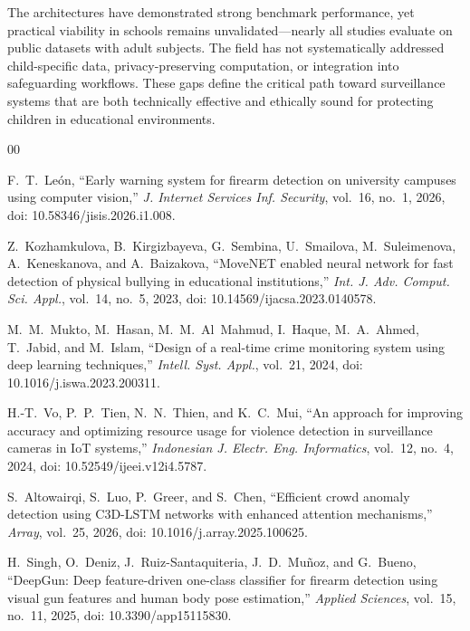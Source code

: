 \documentclass[conference]{IEEEtran}
\begin{document}
The architectures have demonstrated strong benchmark performance, yet practical viability in schools remains unvalidated---nearly all studies evaluate on public datasets with adult subjects. The field has not systematically addressed child-specific data, privacy-preserving computation, or integration into safeguarding workflows. These gaps define the critical path toward surveillance systems that are both technically effective and ethically sound for protecting children in educational environments.

\begin{thebibliography}{00}
\renewcommand{\bibfont}{\scriptsize}
\setlength{\bibsep}{0pt}
\setlength{\bibitemsep}{0pt}

 F.~T.~Le\'{o}n, ``Early warning system for firearm detection on university campuses using computer vision,'' \textit{J. Internet Services Inf. Security}, vol.~16, no.~1, 2026, doi: 10.58346/jisis.2026.i1.008.

 Z.~Kozhamkulova, B.~Kirgizbayeva, G.~Sembina, U.~Smailova, M.~Suleimenova, A.~Keneskanova, and A.~Baizakova, ``MoveNET enabled neural network for fast detection of physical bullying in educational institutions,'' \textit{Int. J. Adv. Comput. Sci. Appl.}, vol.~14, no.~5, 2023, doi: 10.14569/ijacsa.2023.0140578.

 M.~M.~Mukto, M.~Hasan, M.~M.~Al~Mahmud, I.~Haque, M.~A.~Ahmed, T.~Jabid, and M.~Islam, ``Design of a real-time crime monitoring system using deep learning techniques,'' \textit{Intell. Syst. Appl.}, vol.~21, 2024, doi: 10.1016/j.iswa.2023.200311.

 H.-T.~Vo, P.~P.~Tien, N.~N.~Thien, and K.~C.~Mui, ``An approach for improving accuracy and optimizing resource usage for violence detection in surveillance cameras in IoT systems,'' \textit{Indonesian J. Electr. Eng. Informatics}, vol.~12, no.~4, 2024, doi: 10.52549/ijeei.v12i4.5787.

 S.~Altowairqi, S.~Luo, P.~Greer, and S.~Chen, ``Efficient crowd anomaly detection using C3D-LSTM networks with enhanced attention mechanisms,'' \textit{Array}, vol.~25, 2026, doi: 10.1016/j.array.2025.100625.

 H.~Singh, O.~Deniz, J.~Ruiz-Santaquiteria, J.~D.~Mu\~{n}oz, and G.~Bueno, ``DeepGun: Deep feature-driven one-class classifier for firearm detection using visual gun features and human body pose estimation,'' \textit{Applied Sciences}, vol.~15, no.~11, 2025, doi: 10.3390/app15115830.


\end{thebibliography}
\end{document}
